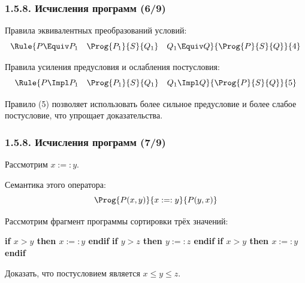 \begin{frame}
\frametitle{1.5.8. Исчисления программ (6/9)}


Правила эквивалентных преобразований условий:
\[
\Rule{P \Equiv P_1 \quad \Prog{P_1}{S}{Q_1} \quad Q_1 \Equiv Q}{\Prog{P}{S}{Q}}{4}
\]

Правила усиления предусловия и ослабления постусловия:
\[
\Rule{P \Impl P_1 \quad \Prog{P_1}{S}{Q_1} \quad Q_1 \Impl Q}{\Prog{P}{S}{Q}}{5}
\]

\begin{remark}
Правило (5) позволяет использовать более сильное предусловие 
и более слабое постусловие, что упрощает доказательства.
\end{remark}

\end{frame}


\begin{frame}
\frametitle{1.5.8. Исчисления программ (7/9)}

\begin{example}
Рассмотрим  $x :=: y$.

Семантика этого оператора:
\[
\Prog{P(x,y)}{x :=: y}{P(y,x)}
\]

Рассмотрим фрагмент программы сортировки трёх значений:
\begin{algorithmic}
\STATE\textbf{if $x > y$ then $x :=: y$ endif}
\STATE\textbf{if $y > z$ then $y :=: z$ endif}
\STATE\textbf{if $x > y$ then $x :=: y$ endif}
\end{algorithmic}

 Доказать, что постусловием является $x \leq y \leq z$.
\end{example}

\end{frame}


